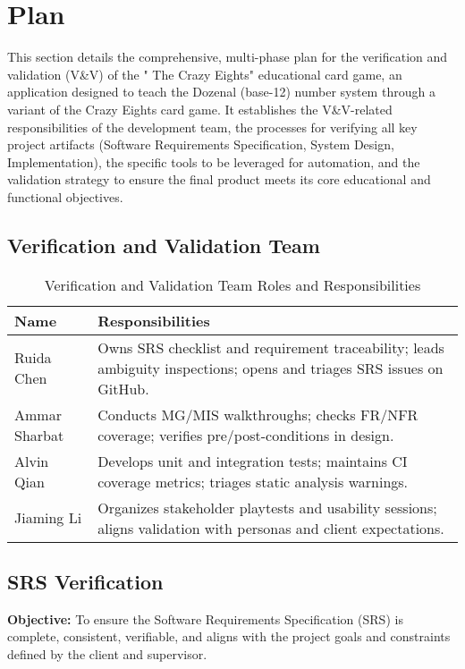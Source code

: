 \documentclass[12pt, titlepage]{article}
\begin{document}
\section{Plan}
This section details the comprehensive, multi-phase plan for the verification and validation (V\&V) of the " The Crazy Eights" educational card game, an application designed to teach the Dozenal (base-12) number system through a variant of the Crazy Eights card game. It establishes the V\&V-related responsibilities of the development team, the processes for verifying all key project artifacts (Software Requirements Specification, System Design, Implementation), the specific tools to be leveraged for automation, and the validation strategy to ensure the final product meets its core educational and functional objectives.   



\subsection{Verification and Validation Team}

\begin{table}[H]
\centering
\caption{Verification and Validation Team Roles and Responsibilities}
\label{tab:vvteam}
\begin{tabularx}{\textwidth}{lX}
\toprule
\textbf{Name} & \textbf{Responsibilities} \\
\midrule
Ruida Chen & Owns SRS checklist and requirement traceability; leads ambiguity inspections; opens and triages SRS issues on GitHub. \\
Ammar Sharbat & Conducts MG/MIS walkthroughs; checks FR/NFR coverage; verifies pre/post-conditions in design. \\
Alvin Qian & Develops unit and integration tests; maintains CI coverage metrics; triages static analysis warnings. \\
Jiaming Li & Organizes stakeholder playtests and usability sessions; aligns validation with personas and client expectations. \\
\bottomrule
\end{tabularx}
\end{table}

\subsection{SRS Verification}
\textbf{Objective:}  
To ensure the Software Requirements Specification (SRS) is complete, consistent, verifiable, and aligns with the project goals and constraints defined by the client and supervisor.
\end{document}
